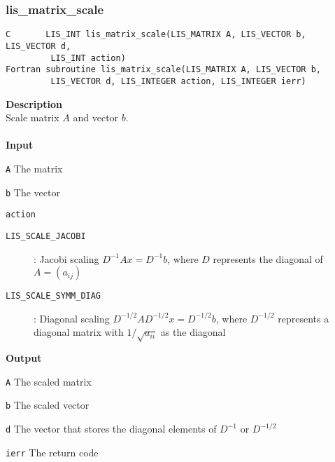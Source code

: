\documentclass[a4paper]{article}
\newcommand{\namelistlabel}[1]{\mbox{#1}\hfill}
\newenvironment{namelist}[1]{%
\begin{list}{}
  {\let\makelabel\namelistlabel
  \settowidth{\labelwidth}{#1}
  \setlength{\leftmargin}{1.1\labelwidth}}
  }{%
\end{list}}
\begin{document}
\newpage
\subsubsection{lis\_matrix\_scale}
\begin{screen}
\verb|C       LIS_INT lis_matrix_scale(LIS_MATRIX A, LIS_VECTOR b, LIS_VECTOR d,|\\
\verb|         LIS_INT action)|\\
\verb|Fortran subroutine lis_matrix_scale(LIS_MATRIX A, LIS_VECTOR b,|\\
\verb|         LIS_VECTOR d, LIS_INTEGER action, LIS_INTEGER ierr)|
\end{screen}
{\bf Description}\\
\indent
Scale matrix $A$ and vector $b$.
\\ \\
\noindent
{\bf Input}
\begin{namelist}{XXXXXXXXXXXXXXXXXXXX}
\item[\tt A] The matrix
\item[\tt b] The vector
\item[\tt action] \begin{description}
\item[\tt LIS\_SCALE\_JACOBI]: Jacobi scaling $D^{-1}Ax=D^{-1}b$, where $D$
	   represents the diagonal of $A=(a_{ij})$
\item[\tt LIS\_SCALE\_SYMM\_DIAG]: Diagonal scaling
	   $D^{-1/2}AD^{-1/2}x=D^{-1/2}b$, where $D^{-1/2}$ represents
	   a diagonal matrix with $1/\sqrt{a_{ii}}$ as the diagonal
\end{description}
\end{namelist}
{\bf Output}
\begin{namelist}{XXXXXXXXXXXXXXXXXXXX}
\item[\tt A] The scaled matrix
\item[\tt b] The scaled vector
\item[\tt d]  The vector that stores the diagonal elements of $D^{-1}$ or $D^{-1/2}$
\item[\tt ierr] The return code
\end{namelist}

\newpage
\end{document}
